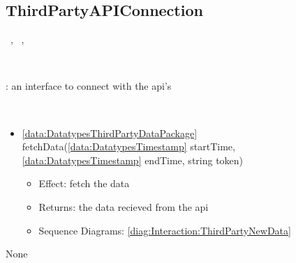   \subsection{ThirdPartyAPIConnection}\label{int:InterfacesThirdPartyAPIConnection}
    \begin{description}
      \item[Provided by:] \iconcomponent{}~, \iconcomponent{}~, \iconcomponent{}~
      \item[Required by:] \iconcomponent{}~ 
           \item[Description]: an interface to connect with the api's
      \item[Operations:] ~
    \begin{itemize}[noitemsep,nolistsep,leftmargin=-.25cm]
      \item \textsf{\ref{data:DatatypesThirdPartyDataPackage} fetchData(\ref{data:DatatypesTimestamp} startTime, \ref{data:DatatypesTimestamp} endTime, string token)}
        \begin{itemize}[noitemsep,nolistsep]
           \item Effect: fetch the data 
           \item Returns: the data recieved from the api
           \item Sequence Diagrams: \cref{diag:Interaction:ThirdPartyNewData}
        \end{itemize}
    \end{itemize}
      \item[Diagrams:] None
    \end{description}

